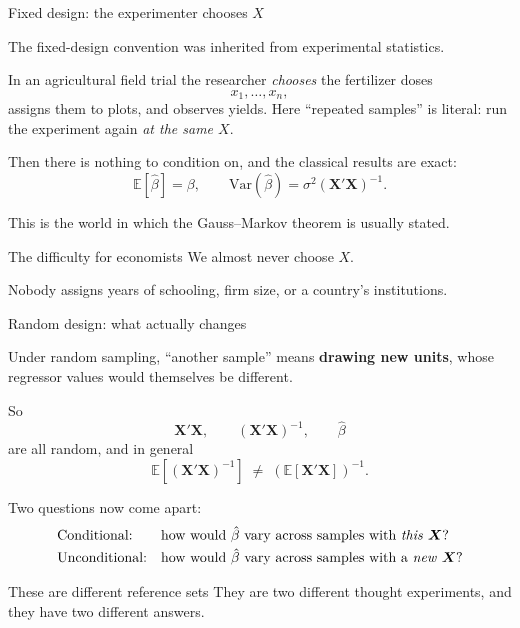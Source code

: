 \documentclass[aspectratio=169,11pt]{beamer}
\newcommand{\E}{\mathbb{E}}
\begin{document}
\begin{frame}{Fixed design: the experimenter chooses $X$}

The fixed-design convention was inherited from experimental statistics.

In an agricultural field trial the researcher \emph{chooses} the fertilizer doses
\[
x_1,\dots,x_n,
\]
assigns them to plots, and observes yields. Here ``repeated samples'' is literal:
run the experiment again \emph{at the same $X$}.

\vspace{0.3em}

Then there is nothing to condition on, and the classical results are exact:
\[
\E[\hat\beta]=\beta,
\qquad
\mathrm{Var}(\hat\beta)=\sigma^2(\bm X'\bm X)^{-1}.
\]

This is the world in which the Gauss--Markov theorem is usually stated.

\vspace{0.35em}

\pause

\begin{alertblock}{The difficulty for economists}
We almost never choose $X$.

Nobody assigns years of schooling, firm size, or a country's institutions.
\end{alertblock}

\end{frame}

\begin{frame}{Random design: what actually changes}

Under random sampling, ``another sample'' means \textbf{drawing new units},
whose regressor values would themselves be different.

So
\[
\bm X'\bm X,
\qquad
(\bm X'\bm X)^{-1},
\qquad
\hat\beta
\]
are all random, and in general
\[
\boxed{
\E\left[(\bm X'\bm X)^{-1}\right]
\;\neq\;
\left(\E[\bm X'\bm X]\right)^{-1}.
}
\]

\vspace{0.25em}

Two questions now come apart:
\[
\begin{array}{ll}
\text{Conditional:}
&
\text{how would }\hat\beta\text{ vary across samples with \emph{this} }\bm X?
\\[0.3em]
\text{Unconditional:}
&
\text{how would }\hat\beta\text{ vary across samples with a \emph{new} }\bm X?
\end{array}
\]

\begin{alertblock}{These are different reference sets}
They are two different thought experiments, and they have two different answers.
\end{alertblock}

\end{frame}
\end{document}
